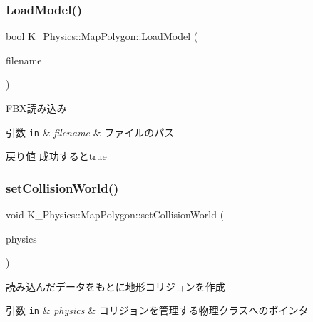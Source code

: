 \subsubsection{\texorpdfstring{Load\+Model()}{LoadModel()}}
{\footnotesize\ttfamily bool K\+\_\+\+Physics\+::\+Map\+Polygon\+::\+Load\+Model (\begin{DoxyParamCaption}\item[{const char $\ast$}]{filename }\end{DoxyParamCaption})}



F\+B\+X読み込み 


\begin{DoxyParams}[1]{引数}
\mbox{\tt in}  & {\em filename} & ファイルのパス \\
\hline
\end{DoxyParams}
\begin{DoxyReturn}{戻り値}
成功するとtrue 
\end{DoxyReturn}
\mbox{\label{class_k___physics_1_1_map_polygon_a17a4ee0e3fce46e74be6ce43f5a51d7e}} 
\subsubsection{\texorpdfstring{set\+Collision\+World()}{setCollisionWorld()}}
{\footnotesize\ttfamily void K\+\_\+\+Physics\+::\+Map\+Polygon\+::set\+Collision\+World (\begin{DoxyParamCaption}\item[{\mbox{\hyperlink{class_k___physics_1_1_bullet_physics}{Bullet\+Physics}} $\ast$}]{physics }\end{DoxyParamCaption})}



読み込んだデータをもとに地形コリジョンを作成 


\begin{DoxyParams}[1]{引数}
\mbox{\tt in}  & {\em physics} & コリジョンを管理する物理クラスへのポインタ \\
\hline
\end{DoxyParams}
